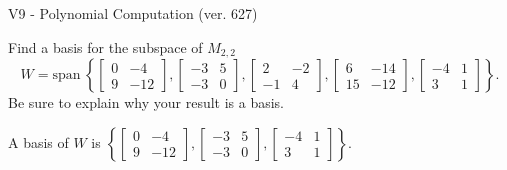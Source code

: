 \begin{exercise}
  \begin{exerciseTitle}V9 - Polynomial Computation (ver. 627)\end{exerciseTitle}
  \begin{exerciseStatement}
    Find a basis for the subspace of \(M_{2,2}\) 
\[W=\mathrm{span}\ \left\{\left[\begin{array}{cc}
0 & -4 \\
9 & -12
\end{array}\right] , \left[\begin{array}{cc}
-3 & 5 \\
-3 & 0
\end{array}\right] , \left[\begin{array}{cc}
2 & -2 \\
-1 & 4
\end{array}\right] , \left[\begin{array}{cc}
6 & -14 \\
15 & -12
\end{array}\right] , \left[\begin{array}{cc}
-4 & 1 \\
3 & 1
\end{array}\right]\right\}.\]
 Be sure to explain why your result is a basis.


  \end{exerciseStatement}
  \begin{exerciseAnswer}
   A basis of \(W\) is  \(\left\{\left[\begin{array}{cc}
0 & -4 \\
9 & -12
\end{array}\right] , \left[\begin{array}{cc}
-3 & 5 \\
-3 & 0
\end{array}\right] , \left[\begin{array}{cc}
-4 & 1 \\
3 & 1
\end{array}\right]\right\}\).
  


  \end{exerciseAnswer}
\end{exercise}